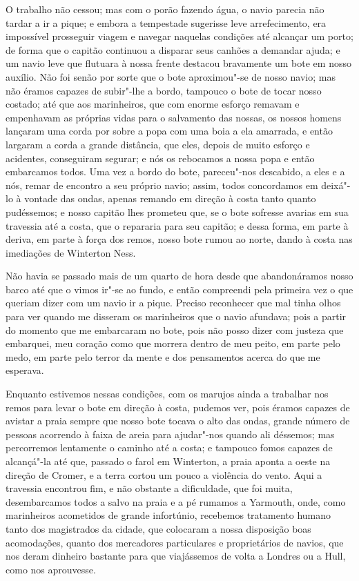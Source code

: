 O trabalho não cessou; mas com o porão fazendo água, o navio parecia não
tardar a ir a pique; e embora a tempestade sugerisse leve arrefecimento,
era impossível prosseguir viagem e navegar naquelas condições até
alcançar um porto; de forma que o capitão continuou a disparar seus
canhões a demandar ajuda; e um navio leve que flutuara à nossa frente
destacou bravamente um bote em nosso auxílio. Não foi senão por sorte
que o bote aproximou"-se de nosso navio; mas não éramos capazes de
subir"-lhe a bordo, tampouco o bote de tocar nosso costado; até que aos
marinheiros, que com enorme esforço remavam e empenhavam as próprias
vidas para o salvamento das nossas, os nossos homens lançaram uma corda
por sobre a popa com uma boia a ela amarrada, e então largaram a corda a
grande distância, que eles, depois de muito esforço e acidentes,
conseguiram segurar; e nós os rebocamos a nossa popa e então embarcamos
todos. Uma vez a bordo do bote, pareceu"-nos descabido, a eles e a nós,
remar de encontro a seu próprio navio; assim, todos concordamos em
deixá"-lo à vontade das ondas, apenas remando em direção à costa tanto
quanto pudéssemos; e nosso capitão lhes prometeu que, se o bote sofresse
avarias em sua travessia até a costa, que o repararia para seu capitão;
e dessa forma, em parte à deriva, em parte à força dos remos, nosso bote
rumou ao norte, dando à costa nas imediações de Winterton Ness.

Não havia se passado mais de um quarto de hora desde que abandonáramos
nosso barco até que o vimos ir"-se ao fundo, e então compreendi pela
primeira vez o que queriam dizer com um navio ir a pique. Preciso
reconhecer que mal tinha olhos para ver quando me disseram os
marinheiros que o navio afundava; pois a partir do momento que me
embarcaram no bote, pois não posso dizer com justeza que embarquei, meu
coração como que morrera dentro de meu peito, em parte pelo medo, em
parte pelo terror da mente e dos pensamentos acerca do que me esperava.

Enquanto estivemos nessas condições, com os marujos ainda a trabalhar
nos remos para levar o bote em direção à costa, pudemos ver, pois éramos
capazes de avistar a praia sempre que nosso bote tocava o alto das
ondas, grande número de pessoas acorrendo à faixa de areia para
ajudar"-nos quando ali déssemos; mas percorremos lentamente o caminho até
a costa; e tampouco fomos capazes de alcançá"-la até que, passado o farol
em Winterton, a praia aponta a oeste na direção de Cromer, e a terra
cortou um pouco a violência do vento. Aqui a travessia encontrou fim, e
não obstante a dificuldade, que foi muita, desembarcamos todos a salvo
na praia e a pé rumamos a Yarmouth, onde, como marinheiros acometidos de
grande infortúnio, recebemos tratamento humano tanto dos magistrados da
cidade, que colocaram a nossa disposição boas acomodações, quanto dos
mercadores particulares e proprietários de navios, que nos deram
dinheiro bastante para que viajássemos de volta a Londres ou a Hull,
como nos aprouvesse.

